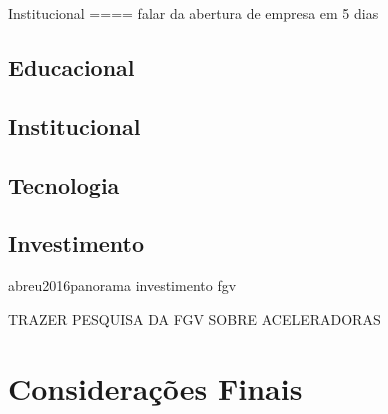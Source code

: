 Institucional
==== falar da abertura de empresa em 5 dias

\subsection{Educacional}
\label{subsection:Educação}

\subsection{Institucional}
\label{subsection:Institucional}

\subsection{Tecnologia}
\label{subsection:Tecnologia}

\subsection{Investimento}
\label{subsection:Investimento}

abreu2016panorama investimento fgv

TRAZER PESQUISA DA FGV SOBRE ACELERADORAS


\section{Considerações Finais}
\label{subsection:consideracoes_finais}